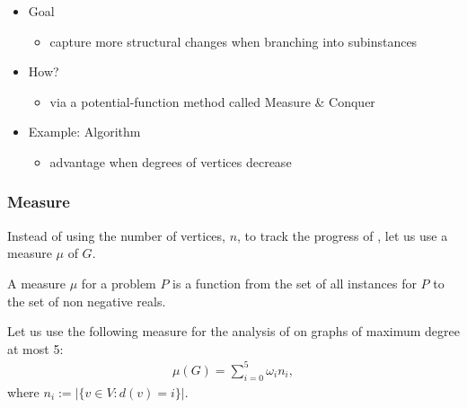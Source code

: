 \begin{frame}
 
 \begin{itemize}
  \item Goal
   \begin{itemize}
    \item capture more structural changes when branching into subinstances
   \end{itemize}
  \item How?
   \begin{itemize}
    \item via a potential-function method called \alert{Measure \& Conquer}
          \cite{FominGK09}
   \end{itemize}
  \item Example: Algorithm \algmis
  \begin{itemize}
   \item advantage when degrees of vertices decrease
  \end{itemize}
 \end{itemize}
 
\end{frame}

\begin{frame}
	\frametitle{Measure}
	
  Instead of using the number of vertices, $n$, to track the progress of \algmis, let us use a measure $\mu$ of $G$.

  \begin{definition}
    A \alert{measure} $\mu$ for a problem $P$ is a function from the set of all instances for $P$ to the set of non negative reals.
  \end{definition}

  Let us use the following measure for the analysis of \algmis on graphs of maximum degree at most 5:
   \begin{align*}
    \mu(G) = \sum_{i=0}^5 \omega_i n_i,
   \end{align*}
   where $n_i:=|\{v\in V: d(v)=i\}|$.

\end{frame}


